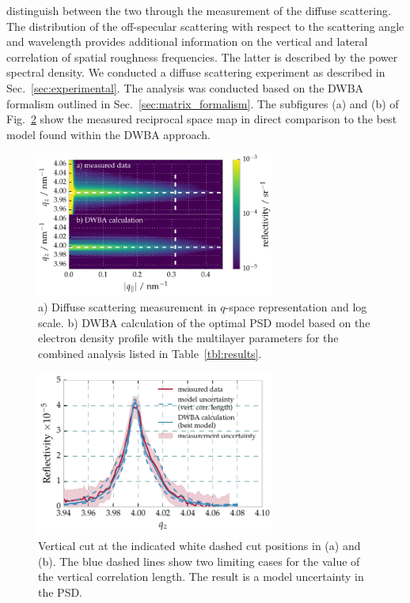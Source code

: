 distinguish between the two through the measurement of the diffuse scattering. 
The distribution of the off-specular scattering with respect to the scattering 
angle and wavelength provides additional information on the vertical and 
lateral correlation of spatial roughness frequencies. The latter is described 
by the power spectral density. We conducted a diffuse scattering experiment as 
described in Sec.~\ref{sec:experimental}. The analysis was conducted based on 
the DWBA formalism outlined in Sec.~\ref{sec:matrix_formalism}. The subfigures 
(a) and (b) of Fig.~\ref{fig:diffuse_meas} show the measured reciprocal space 
map in direct comparison to the best model found within the DWBA approach.
\onecolumn
\begin{figure}[htbp]
  \centering
  \includegraphics[width=0.7\textwidth]{img/CrSc_diffuse_measured_vs_dwba}
  \caption{a) Diffuse scattering measurement in $q$-space representation and 
log scale. b) DWBA calculation of the optimal PSD model based on the electron 
density profile with the multilayer parameters for the combined analysis listed 
in Table~\ref{tbl:results}.}
  \label{fig:diffuse_meas}
\end{figure}

\begin{figure}[htbp]
  \centering
  \includegraphics[width=0.7\textwidth]{img/CrSc_diffuse_vertical_correlation}
  \caption{ Vertical cut at the indicated white dashed cut 
positions in (a) and (b). The blue dashed lines show two limiting cases for the 
value of the vertical correlation length. The result is a model uncertainty in 
the PSD.}
  \label{fig:diffuse_meas}
\end{figure}

